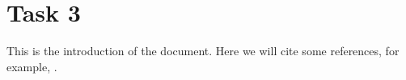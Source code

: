 \section{Task 3}
This is the introduction of the document. Here we will cite some references, for example, \cite{knuth1984texbook}.

